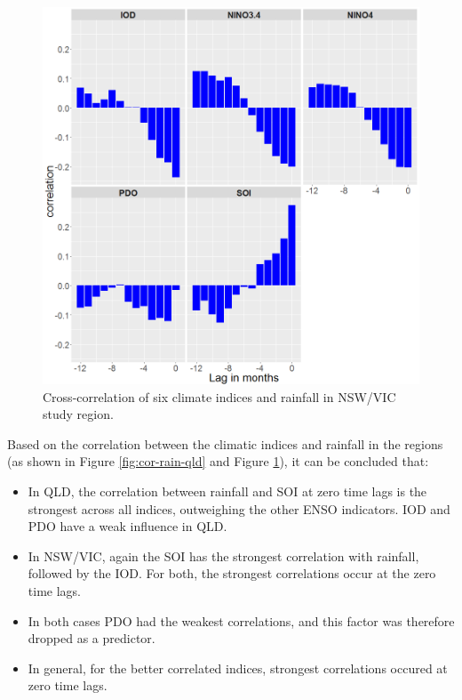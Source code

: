 \documentclass[fleqn,10pt,lineno]{wlpeerj} %
\providecommand{\tightlist}{
\setlength{\itemsep}{0pt}\setlength{\parskip}{0pt}}
\theoremstyle{definition}
\theoremstyle{definition}
\theoremstyle{definition}
\theoremstyle{remark}
\begin{document}
\begin{figure}
\includegraphics[width=0.9\linewidth]{figures/cor_nswvic} \caption{Cross-correlation of six climate indices and rainfall in NSW/VIC study region.}\label{fig:cor-rain-nsw}
\end{figure}

Based on the correlation between the climatic indices and rainfall in
the regions (as shown in Figure \ref{fig:cor-rain-qld} and Figure
\ref{fig:cor-rain-nsw}), it can be concluded that:

\begin{itemize}
\tightlist
\item
  In QLD, the correlation between rainfall and SOI at zero time lags is
  the strongest across all indices, outweighing the other ENSO
  indicators. IOD and PDO have a weak influence in QLD.\\
\item
  In NSW/VIC, again the SOI has the strongest correlation with rainfall,
  followed by the IOD. For both, the strongest correlations occur at the
  zero time lags.\\
\item
  In both cases PDO had the weakest correlations, and this factor was
  therefore dropped as a predictor.\\
\item
  In general, for the better correlated indices, strongest correlations
  occured at zero time lags.
\end{itemize}
\end{document}
